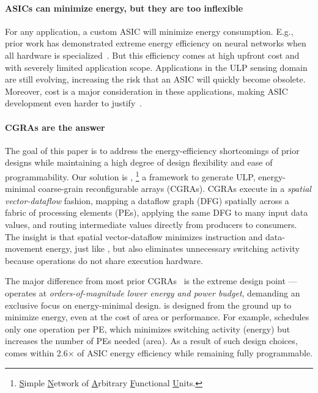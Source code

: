 \paragraph{ASICs can minimize energy, but they are too inflexible}
%
For any application, a custom ASIC will minimize energy consumption.
%
E.g., prior work has demonstrated extreme energy efficiency on neural networks when all hardware is specialized~\cite{reagen2016minerva,andri2016yodann,lee2018unpu,bong201714}.
%
But this efficiency comes at high upfront cost and with severely limited application scope.
% 
Applications in the ULP sensing domain are still evolving,
increasing the risk that an ASIC will quickly become obsolete.
%
Moreover, cost is a major consideration in these applications,
making ASIC development even harder to justify~\cite{hotmobile2021}.
%

\paragraph{\Ulp CGRAs are the answer}
%
The goal of this paper is to address the energy-efficiency shortcomings of prior designs while maintaining a high degree of design flexibility and ease of programmability.
%
Our solution is \snafuframe,%
\footnote{\underline{S}imple \underline{N}etwork of \underline{A}rbitrary \underline{F}unctional \underline{U}nits.}
a framework to generate ULP, energy-minimal coarse-grain reconfigurable arrays (CGRAs).
%
\snafuframe CGRAs execute in a \emph{spatial vector-dataflow} fashion,
mapping a dataflow graph (DFG) spatially across a fabric of processing elements (PEs),
applying the same DFG to many input data values,
and routing intermediate values directly from producers to consumers.
%
The insight is that spatial vector-dataflow minimizes instruction and data-movement energy, just like \manic,
but also eliminates unnecessary switching activity because operations do not share execution hardware.

The major difference from most prior CGRAs~\cite{plasticine,dyser,nowatzki:isca17:stream-dataflow,goldstein2000piperench,trips,weng2020dsagen,weng2020hybrid,voitsechov2014single,mishra2006tartan,tan2018stitch,karunaratne2017hycube,voitsechov2018inter,evx} is the extreme design point
--- \snafuframe operates at \emph{orders-of-magnitude lower energy and power budget},
demanding an exclusive focus on energy-minimal design.
%
\snafuframe is designed from the ground up to minimize energy, even at
the cost of area or performance.
%
For example, \snafuframe schedules only one operation per PE, which
minimizes switching activity (energy) but increases the number of PEs needed (area).
%
As a result of such design choices, \snafuframe comes within 2.6$\times$
of ASIC energy efficiency while remaining fully programmable.
%

